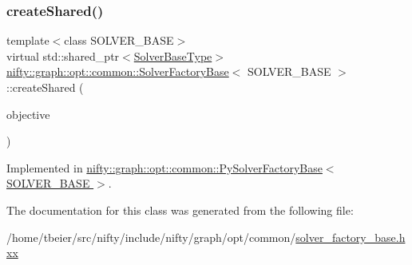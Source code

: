 \subsubsection{\texorpdfstring{create\+Shared()}{createShared()}}
{\footnotesize\ttfamily template$<$class S\+O\+L\+V\+E\+R\+\_\+\+B\+A\+SE$>$ \\
virtual std\+::shared\+\_\+ptr$<$\hyperlink{classnifty_1_1graph_1_1opt_1_1common_1_1SolverFactoryBase_a83f347591f4cffa7afb13c8f495dcce2}{Solver\+Base\+Type}$>$ \hyperlink{classnifty_1_1graph_1_1opt_1_1common_1_1SolverFactoryBase}{nifty\+::graph\+::opt\+::common\+::\+Solver\+Factory\+Base}$<$ S\+O\+L\+V\+E\+R\+\_\+\+B\+A\+SE $>$\+::create\+Shared (\begin{DoxyParamCaption}\item[{const \hyperlink{classnifty_1_1graph_1_1opt_1_1common_1_1SolverFactoryBase_ab71d93640cf3fbc0bc980450d5db6e45}{Objective\+Type} \&}]{objective }\end{DoxyParamCaption})\hspace{0.3cm}{\ttfamily [pure virtual]}}



Implemented in \hyperlink{classnifty_1_1graph_1_1opt_1_1common_1_1PySolverFactoryBase_a5a45a0822389b91bfb143ee1150633be}{nifty\+::graph\+::opt\+::common\+::\+Py\+Solver\+Factory\+Base$<$ S\+O\+L\+V\+E\+R\+\_\+\+B\+A\+S\+E $>$}.



The documentation for this class was generated from the following file\+:\begin{DoxyCompactItemize}
\item 
/home/tbeier/src/nifty/include/nifty/graph/opt/common/\hyperlink{solver__factory__base_8hxx}{solver\+\_\+factory\+\_\+base.\+hxx}\end{DoxyCompactItemize}
